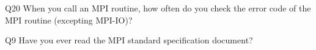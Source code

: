 \begin{description}%
\item{Q20} When you call an MPI routine, how often do you check the error code of the MPI routine  (excepting MPI-IO)?%
\item{Q9} Have you ever read the MPI standard specification document?%
\end{description}%
